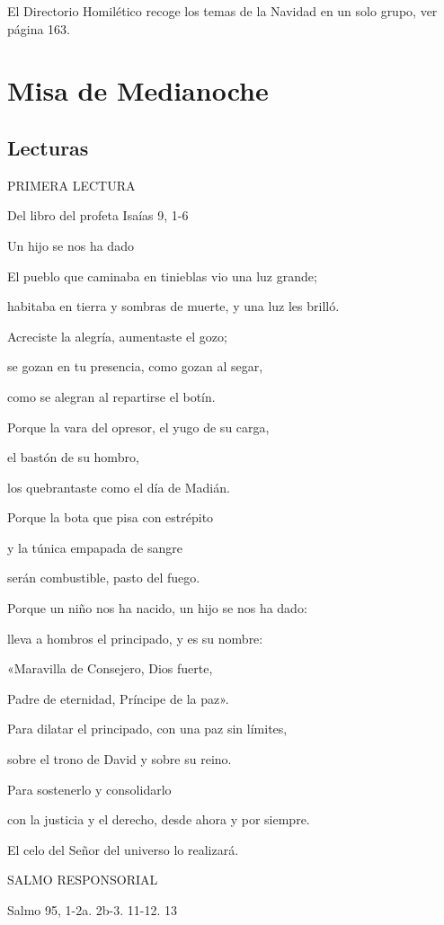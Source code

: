 \begin{body}
\begin{body}
El Directorio Homilético recoge los temas de la Navidad en un solo grupo, ver página 163.

\chapter{Misa de Medianoche}

\section{Lecturas}

PRIMERA LECTURA

Del libro del profeta Isaías 9, 1-6

Un hijo se nos ha dado

El pueblo que caminaba en tinieblas vio una luz grande;

habitaba en tierra y sombras de muerte, y una luz les brilló.

Acreciste la alegría, aumentaste el gozo;

se gozan en tu presencia, como gozan al segar,

como se alegran al repartirse el botín.

Porque la vara del opresor, el yugo de su carga,

el bastón de su hombro,

los quebrantaste como el día de Madián.

Porque la bota que pisa con estrépito

y la túnica empapada de sangre

serán combustible, pasto del fuego.

Porque un niño nos ha nacido, un hijo se nos ha dado:

lleva a hombros el principado, y es su nombre:

«Maravilla de Consejero, Dios fuerte,

Padre de eternidad, Príncipe de la paz».

Para dilatar el principado, con una paz sin límites,

sobre el trono de David y sobre su reino.

Para sostenerlo y consolidarlo

con la justicia y el derecho, desde ahora y por siempre.

El celo del Señor del universo lo realizará.

SALMO RESPONSORIAL

Salmo 95, 1-2a. 2b-3. 11-12. 13


\end{body}
\end{body}
